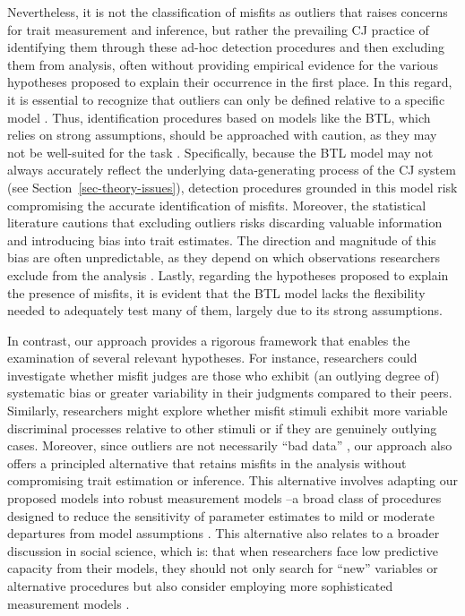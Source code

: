 \documentclass[
  authoryear,
  review,
  1p]{elsarticle}
\begin{document}
Nevertheless, it is not the classification of misfits as outliers that
raises concerns for trait measurement and inference, but rather the
prevailing CJ practice of identifying them through these ad-hoc
detection procedures and then excluding them from analysis, often
without providing empirical evidence for the various hypotheses proposed
to explain their occurrence in the first place. In this regard, it is
essential to recognize that outliers can only be defined relative to a
specific model \citep{McElreath_2020}. Thus, identification procedures
based on models like the BTL, which relies on strong assumptions, should
be approached with caution, as they may not be well-suited for the task
\citep{Kelly_et_al_2022}. Specifically, because the BTL model may not
always accurately reflect the underlying data-generating process of the
CJ system (see Section~\ref{sec-theory-issues}), detection procedures
grounded in this model risk compromising the accurate identification of
misfits. Moreover, the statistical literature cautions that excluding
outliers risks discarding valuable information \citep{Miller_2023} and
introducing bias into trait estimates. The direction and magnitude of
this bias are often unpredictable, as they depend on which observations
researchers exclude from the analysis
\citep{Zimmerman_1994, OHagan_2018, McElreath_2020}. Lastly, regarding
the hypotheses proposed to explain the presence of misfits, it is
evident that the BTL model lacks the flexibility needed to adequately
test many of them, largely due to its strong assumptions.

In contrast, our approach provides a rigorous framework that enables the
examination of several relevant hypotheses. For instance, researchers
could investigate whether misfit judges are those who exhibit (an
outlying degree of) systematic bias or greater variability in their
judgments compared to their peers. Similarly, researchers might explore
whether misfit stimuli exhibit more variable discriminal processes
relative to other stimuli or if they are genuinely outlying cases.
Moreover, since outliers are not necessarily ``bad data''
\citep{McElreath_2020}, our approach also offers a principled
alternative that retains misfits in the analysis without compromising
trait estimation or inference. This alternative involves adapting our
proposed models into robust measurement models \citep{McElreath_2020}--a
broad class of procedures designed to reduce the sensitivity of
parameter estimates to mild or moderate departures from model
assumptions \citep{Everitt_et_al_2010}. This alternative also relates to
a broader discussion in social science, which is: that when researchers
face low predictive capacity from their models, they should not only
search for ``new'' variables or alternative procedures but also consider
employing more sophisticated measurement models
\citep{Wainer_et_al_1978}.
\end{document}
